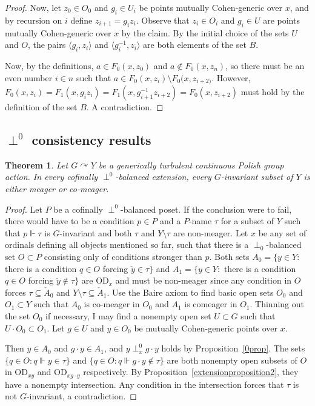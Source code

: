 \documentclass{article}
\newcommand{\acts}{\curvearrowright}
\newcommand{\vd}{\mathrm{OD}}
\newtheorem{theorem}{Theorem}[section]
\theoremstyle{definition}
\begin{document}
\begin{proof}
Now, let $z_0\in O_0$ and $g_i\in U_i$ be points mutually Cohen-generic over $x$, and by recursion on $i$ define $z_{i+1}=g_iz_i$. Observe that $z_i\in O_i$ and $g_i\in U$ are points mutually Cohen-generic over $x$ by the claim. By the initial choice of the sets $U$ and $O$, the pairs $\langle g_i, z_i\rangle$ and $\langle g_i^{-1}, z_i\rangle$ are both elements of the set $B$. 

Now, by the definitions, $a\in F_0(x, z_0)$ and $a\notin F_0(x, z_n)$, so there must be an even number $i\in n$ such that $a\in F_0(x, z_i)\setminus F_0(x, z_{i+2)}$. However, $F_0(x, z_i)=F_1(x, g_iz_i)=F_1(x, g_{i+1}^{-1}z_{i+2})=F_0(x, z_{i+2})$ must hold by the definition of the set $B$. A contradiction.
\end{proof}


\subsection{$\perp^0$ consistency results}

\begin{theorem}
Let $G\acts Y$ be a generically turbulent continuous Polish group action. In every cofinally $\perp^0$-balanced extension, every $G$-invariant subset of $Y$ is either meager or co-meager.
\end{theorem}

\begin{proof}
Let $P$ be a cofinally $\perp^0$-balanced poset. If the conclusion were to fail, there would have to be a condition $p\in P$ and a $P$-name $\tau$ for a subset of $Y$ such that $p\Vdash\tau$ is $G$-invariant and both $\tau$ and $Y\setminus\tau$ are non-meager. Let $x$ be any set of ordinals defining all objects mentioned so far, such that there is a $\perp_0$-balanced set $O\subset P$ consisting only of conditions stronger than $p$. Both sets $A_0=\{y\in Y\colon$ there is a condition $q\in O$ forcing $\check y\in\tau\}$ and $A_1=\{y\in Y\colon$ there is a condition $q\in O$ forcing $\check y\notin\tau\}$ are $\vd_x$ and must be non-meager since any condition in $O$ forces $\tau\subseteq\check A_0$ and $Y\setminus \tau\subseteq\check A_1$. Use the Baire axiom to find basic open sets $O_0$ and $O_1\subset Y$ such that $A_0$ is co-meager in $O_0$ and $A_1$ is comeager in $O_1$. Thinning out the set $O_0$ if necessary, I may find a nonempty open set $U\subset G$ such that $U\cdot O_0\subset O_1$. Let $g\in U$ and $y\in O_0$ be mutually Cohen-generic points over $x$.

Then $y\in A_0$ and $g\cdot y\in A_1$, and $y\perp^0_xg\cdot y$ holds by Proposition~\ref{0prop}. The sets $\{q\in O\colon q\Vdash y\in\tau\}$ and $\{q\in O\colon q\Vdash g\cdot y\notin\tau\}$ are both nonempty open subsets of $O$ in $\vd_{xy}$ and $\vd_{xg\cdot y}$ respectively. By Proposition~\ref{extensionproposition2}, they have a nonempty intersection. Any condition in the intersection forces that $\tau$ is not $G$-invariant, a contradiction.
\end{proof}
\end{document}

